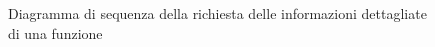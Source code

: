\begin{figure}[H]
	\noindent
	\caption{Diagramma di sequenza della richiesta delle informazioni dettagliate di una funzione}
\end{figure}

